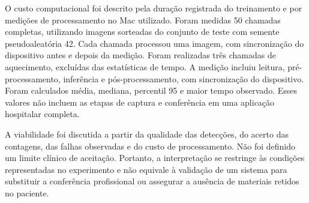O custo computacional foi descrito pela duração registrada do treinamento e por medições de processamento no Mac utilizado. Foram medidas 50 chamadas completas, utilizando imagens sorteadas do conjunto de teste com semente pseudoaleatória 42. Cada chamada processou uma imagem, com sincronização do dispositivo antes e depois da medição. Foram realizadas três chamadas de aquecimento, excluídas das estatísticas de tempo. A medição incluiu leitura, pré-processamento, inferência e pós-processamento, com sincronização do dispositivo. Foram calculados média, mediana, percentil 95 e maior tempo observado. Esses valores não incluem as etapas de captura e conferência em uma aplicação hospitalar completa.

A viabilidade foi discutida a partir da qualidade das detecções, do acerto das contagens, das falhas observadas e do custo de processamento. Não foi definido um limite clínico de aceitação. Portanto, a interpretação se restringe às condições representadas no experimento e não equivale à validação de um sistema para substituir a conferência profissional ou assegurar a ausência de materiais retidos no paciente.

\endgroup
